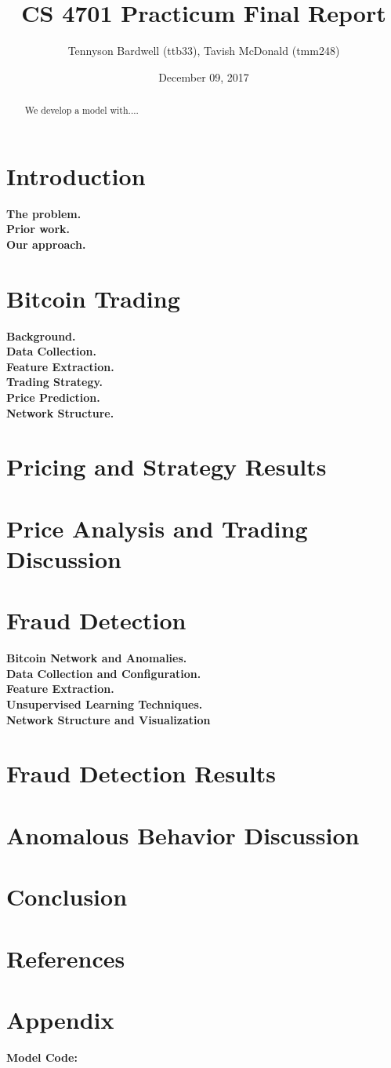 \documentclass{article}
\title{CS 4701 Practicum Final Report}
\author{Tennyson Bardwell (ttb33), Tavish McDonald (tmm248)}
\date{December 09, 2017}
\begin{document}
\maketitle
\begin{abstract}
We develop a model with....  
\end{abstract}

\section{Introduction}
\textbf{The problem.}\\
\textbf{Prior work.}\\
\textbf{Our approach.}\\

\section{Bitcoin Trading}
\textbf{Background.}\\
\textbf{Data Collection.}\\
\textbf{Feature Extraction.}\\
\textbf{Trading Strategy.}\\
\textbf{Price Prediction.}\\
\textbf{Network Structure.}\\

\section{Pricing and Strategy Results}

\section{Price Analysis and Trading Discussion}

\section{Fraud Detection}
\textbf{Bitcoin Network and Anomalies.}\\
\textbf{Data Collection and Configuration.}\\
\textbf{Feature Extraction.}\\
\textbf{Unsupervised Learning Techniques.}\\
\textbf{Network Structure and Visualization}\\

\section{Fraud Detection Results}

\section{Anomalous Behavior Discussion}




\section{Conclusion}
 
\section*{References}
\newpage
\section*{Appendix}
\textbf{Model Code:}
\end{document}
